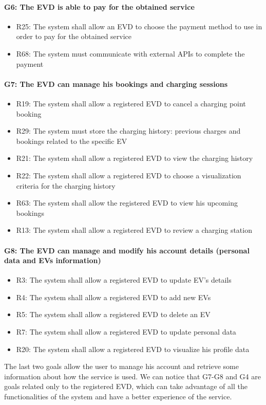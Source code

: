 \paragraph{G6: The EVD is able to pay for the obtained service}
\begin{itemize}
    \item R25: The system shall allow an EVD to choose the payment method to use in order to pay for the obtained service
    \item R68: The system must communicate with external APIs to complete the payment
\end{itemize}

\paragraph{G7: The EVD can manage his bookings and charging sessions}
\begin{itemize}
    \item R19: The system shall allow a registered EVD to cancel a charging point booking
    \item R29: The system must store the charging history: previous charges and bookings related to the specific EV
    \item R21: The system shall allow a registered EVD to view the charging history 
    \item R22: The system shall allow a registered EVD to choose a visualization criteria for the charging history
    \item R63: The system shall allow the registered EVD to view his upcoming bookings
    \item R13: The system shall allow a registered EVD to review a charging station 
\end{itemize}

\paragraph{G8: The EVD can manage and modify his account details (personal data and EVs information)}
\begin{itemize}
    \item R3: The system shall allow a registered EVD to update EV's details
    \item R4: The system shall allow a registered EVD to add new EVs
    \item R5: The system shall allow a registered EVD to delete an EV
    \item R7: The system shall allow a registered EVD to update personal data
    \item R20: The system shall allow a registered EVD to visualize his profile data
\end{itemize}
The last two goals allow the user to manage his account and retrieve some information about how the service is used. We can notice that G7-G8 and G4 are goals related only to the registered EVD, which can take advantage of all the functionalities of the system and have a better experience of the service.

